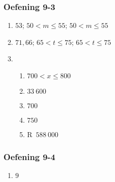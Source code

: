 {\begin{multicols}{3}
\subsubsection*{Oefening 9-3} %

  \begin{enumerate}[noitemsep, label=\textbf{\arabic*}.]

  \item %
$53$; $50<m \leq 55$; $50 < m \leq 55$
  \item %
$71,66$; $65 < t \leq 75$; $65 < t \leq 75$
\item %
\begin{enumerate}[noitemsep, label=\textbf{(\alph*)} ]
\item $700 < x\leq800$%
\item $33~600$%
\item $700$ %
\item $750$%
\item R~$588~000$%
\end{enumerate}

  \end{enumerate}



\subsubsection*{Oefening 9-4} %
  \begin{enumerate}[noitemsep, label=\textbf{\arabic*}.]

  \item $9$%


\end{enumerate}
\end{multicols}}
